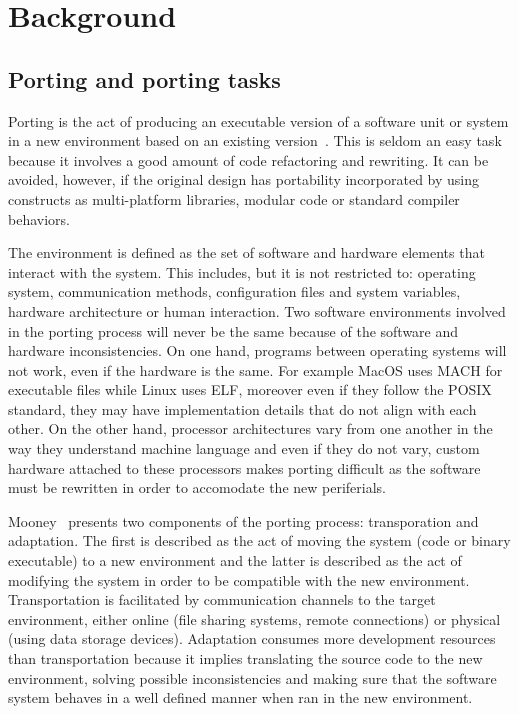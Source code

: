 \section{Background} \label{sec:background}


\subsection{Porting and porting tasks}

Porting is the act of producing an executable version of a software unit or
system in a new environment based on an existing version~\cite{b7}. This is
seldom an easy task because it involves a good amount of code refactoring and
rewriting. It can be avoided, however, if the original design has portability
incorporated by using constructs as multi-platform libraries, modular code or
standard compiler behaviors.

The environment is defined as the set of software and hardware elements that
interact with the system. This includes, but it is not restricted to: operating
system, communication methods, configuration files and system variables,
hardware architecture or human interaction. Two software environments involved
in the porting process will never be the same because of the software and
hardware inconsistencies. On one hand, programs between operating systems will
not work, even if the hardware is the same. For example MacOS uses MACH for
executable files while Linux uses ELF, moreover even if they follow the POSIX
standard, they may have implementation details that do not align with each
other. On the other hand, processor architectures vary from one another in the
way they understand machine language and even if they do not vary, custom
hardware attached to these processors makes porting difficult as the software
must be rewritten in order to accomodate the new periferials.

Mooney~\cite{b7} presents two components of the porting process:
transporation and adaptation. The first is described as the act of moving the
system (code or binary executable) to a new environment and the latter is
described as the act of modifying the system in order to be compatible with the
new environment. Transportation is facilitated by communication channels to the
target environment, either online (file sharing systems, remote connections) or
physical (using data storage devices). Adaptation consumes more development
resources than transportation because it implies translating the source code to
the new environment, solving possible inconsistencies and making sure that the
software system behaves in a well defined manner when ran in the new
environment.

